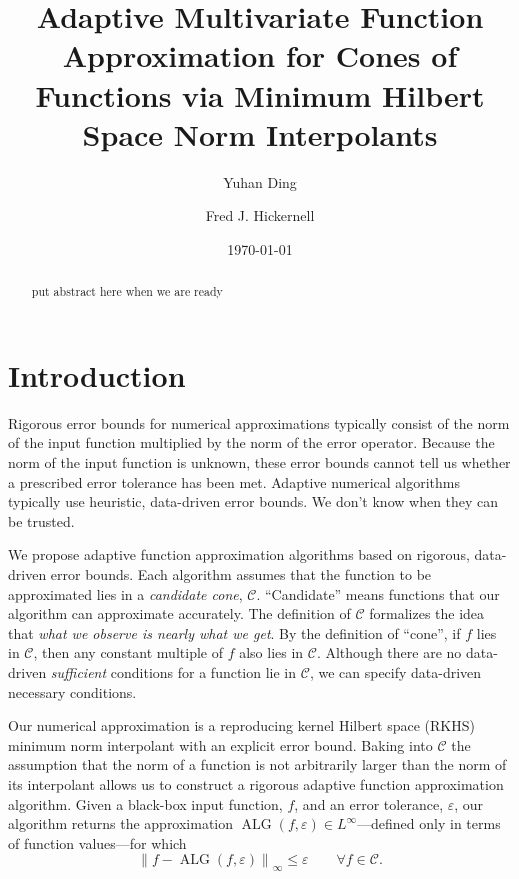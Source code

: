 \documentclass[]{mcom-l}
\title[Adaptive Multivariate Function Approximation]{Adaptive Multivariate Function Approximation for Cones of Functions via Minimum Hilbert Space Norm Interpolants}
\author{Yuhan Ding}
\author{Fred J. Hickernell}
\date{\today}
\theoremstyle{theorem}
\theoremstyle{remark}
\DeclareMathOperator{\ALG}{ALG}
\newcommand{\cc}{\mathcal{C}}
\newcommand{\calc}{{\mathcal{C}}}
\newcommand{\norm}[2][{}]{\ensuremath{\left \lVert #2 \right \rVert}_{#1}}
\begin{document}
\maketitle

\begin{abstract}
    put abstract here when we are ready
\end{abstract}


\section{Introduction}
Rigorous error bounds for numerical approximations typically consist of the norm of the input function multiplied by the norm of the error operator.  Because the norm of the input function is unknown, these error bounds cannot tell us whether a prescribed error tolerance has been met.  Adaptive numerical algorithms typically use heuristic, data-driven error bounds.  We don't know when they can be trusted.

We propose  adaptive function approximation algorithms based on rigorous, data-driven error bounds.  Each algorithm assumes that the function to be approximated lies in a \emph{candidate cone}, $\cc$.  ``Candidate'' means functions that our algorithm can approximate accurately.  The definition of $\cc$ formalizes the idea that \emph{what we observe is nearly what we get}.  By the definition of ``cone'', if $f$ lies in $\cc$, then any constant multiple of $f$  also lies in $\cc$.  Although there are no data-driven \emph{sufficient} conditions for a function lie in $\calc$, we can specify data-driven necessary conditions.

Our numerical approximation is a reproducing kernel Hilbert space (RKHS) minimum norm interpolant with an explicit error bound.  Baking into $\cc$ the assumption that the norm of a function is not arbitrarily larger than the norm of its interpolant allows us to construct a rigorous adaptive function approximation algorithm. Given a black-box input function, $f$, and an error tolerance, $\varepsilon$, our algorithm returns the approximation $\ALG(f,\varepsilon) \in L^\infty$---defined only in terms of function values---for which 
\begin{equation} \label{eq:errorcrit}
\norm[\infty]{f - \ALG(f,\varepsilon)} \le \varepsilon \qquad \forall f\in \cc.
\end{equation}
\end{document}
